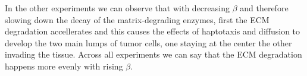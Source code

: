 In the other experiments we can observe that with decreasing $\beta$ and therefore slowing down the decay of the matrix-degrading enzymes, first the ECM degradation accellerates and this causes the effects of haptotaxis and diffusion to develop the two main lumps of tumor cells, one staying at the center the other invading the tissue.
Across all experiments we can say that the ECM degradation happens more evenly with rising $\beta$.

